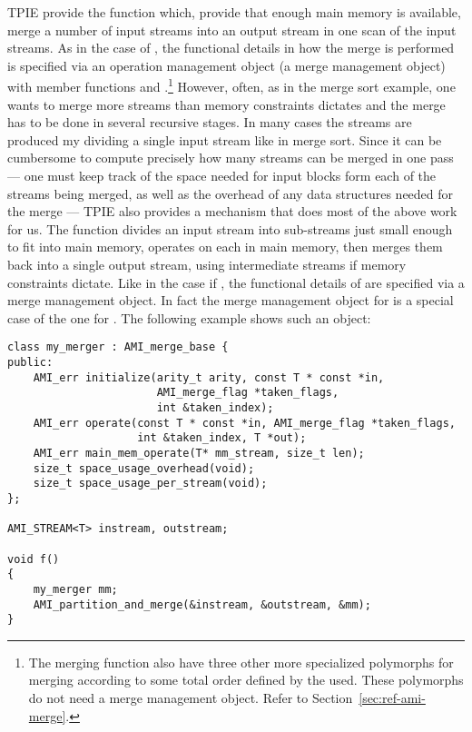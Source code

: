TPIE provide the function  which, provide that enough
main memory is available, merge a number of input streams into an output
stream in one scan of the input streams. As in the case of ,
the functional details in how the merge is performed is specified via an
operation management object (a merge
management object) with member functions  and
.\footnote{The merging function also have three other more
specialized polymorphs for merging according to some total order defined by
the used. These polymorphs do not need a merge management object. Refer to
Section~\ref{sec:ref-ami-merge}.} However, often, as in the merge sort
example, one wants to merge more streams than memory constraints dictates
and the merge has to be done in several recursive stages. In many cases the streams are produced my
dividing a single input stream like in merge sort. Since it can be
cumbersome to compute precisely how many streams can be merged in one pass
--- one must keep track of the space needed for input blocks form each of
the streams being merged, as well as the overhead of any data structures
needed for the merge --- TPIE also provides a mechanism that does most of
the above work for us. The function 
divides an input stream into sub-streams just small enough to fit into main
memory, operates on each in main memory, then merges them back into a
single output stream, using intermediate streams if memory constraints
dictate. Like in the case if , the functional details of
 are specified via a merge management
object. In fact the merge management object for  is a
special case of the one for . The following
example shows such an object:

\begin{verbatim}
class my_merger : AMI_merge_base {
public:
    AMI_err initialize(arity_t arity, const T * const *in,
                       AMI_merge_flag *taken_flags,
                       int &taken_index);
    AMI_err operate(const T * const *in, AMI_merge_flag *taken_flags,
                    int &taken_index, T *out);
    AMI_err main_mem_operate(T* mm_stream, size_t len);
    size_t space_usage_overhead(void);
    size_t space_usage_per_stream(void);
};

AMI_STREAM<T> instream, outstream;

void f() 
{
    my_merger mm;    
    AMI_partition_and_merge(&instream, &outstream, &mm);
}
\end{verbatim}

